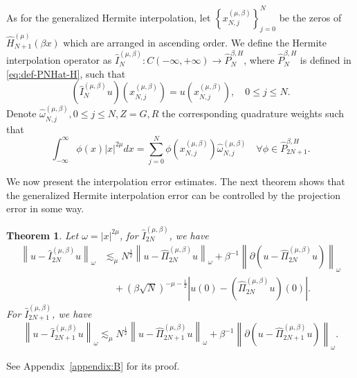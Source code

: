 \documentclass[pdflatex,sn-aps]{sn-jnl}%
\theoremstyle{thmstyleone}%
\newtheorem{theorem}{Theorem}[section]%
\theoremstyle{thmstyletwo}%
\theoremstyle{thmstylethree}%
\begin{document}
As for the generalized Hermite interpolation, let $\left\{x_{N,j}^{(\mu,\beta)}\right\}_{j=0}^N$
be the zeros of $\widehat{H}_{N+1}^{(\mu)}(\beta x)$ which are arranged in ascending order. 
We define the Hermite interpolation operator as
$\widehat{I}_{N}^{(\mu,\beta)}: C(-\infty,+\infty) \rightarrow \widehat{P}_N^{\beta,H}$,
where $\widehat{P}_N^{\beta,H}$ is defined in \eqref{eq:def-PNHat-H},
such that
\begin{equation}\label{eq:0710-3}
  \left(\widehat{I}_{N}^{(\mu,\beta)} u\right)\left(x_{N,j}^{(\mu,\beta)}\right)=u\left(x_{N,j}^{(\mu,\beta)}\right), \quad 0 \leqslant j \leqslant N.
\end{equation}
Denote $\widehat{\omega}_{N, j}^{(\mu, \beta)}, 0 \leqslant j \leqslant N, Z = G,R$ the corresponding
quadrature weights such that
\begin{equation}\label{Hermite weights def}
  \int_{-\infty}^\infty \phi(x) |x|^{2\mu} d x=\sum_{j=0}^N \phi\left(x_{N, j}^{(\mu, \beta)}\right) \widehat{\omega}_{N, j}^{(\mu, \beta)} \quad \forall \phi \in \widehat{P}_{2 N+1}^{\beta, H}.
\end{equation}

We now present the interpolation error estimates. The next theorem
shows that the generalized Hermite interpolation error can be controlled by
the projection error in some way.

\begin{theorem}\label{thm:0810-1}
  Let $\omega = |x|^{2\mu}$, for $\widehat{I}_{2 N}^{(\mu, \beta)}$, we have
  \begin{equation}\label{eq:0810-12}
    \begin{aligned}
    \left\|u-\widehat{I}_{2 N}^{(\mu, \beta)} u\right\|_{\omega} 
    & \lesssim_\mu N^{\frac{1}{2}}\left\|u-\widehat{\Pi}_{2 N}^{(\mu, \beta)} u\right\|_{\omega}+ \beta^{-1}\left\|\partial\left(u-\widehat{\Pi}_{2 N}^{(\mu, \beta)} u\right)\right\|_{\omega} \\
    &{}\quad +(\beta \sqrt{N})^{-\mu-\frac{1}{2}}\left|u(0)-\left(\widehat{\Pi}_{2 N}^{(\mu, \beta)} u\right)(0)\right|.
    \end{aligned}
  \end{equation}
  For $\widehat{I}_{2 N + 1}^{(\mu, \beta)}$, we have
  \begin{equation}\label{eq:0810-13}
    \left\|u-\widehat{I}_{2 N+1}^{(\mu, \beta)} u\right\|_{\omega} \lesssim_\mu N^{\frac{1}{2}}\left\|u-\widehat{\Pi}_{2 N+1}^{(\mu, \beta)} u\right\|_{\omega}+ \beta^{-1} \left\|\partial\left(u-\widehat{\Pi}_{2 N+1}^{(\mu, \beta)} u\right)\right\|_{\omega}.
  \end{equation}
\end{theorem}
See Appendix~\ref{appendix:B} for its proof.
\end{document}

